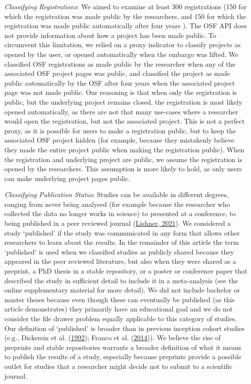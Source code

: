 \documentclass[
  ,jou, a4paper,floatsintext]{apa6}
\begin{document}
\emph{Classifying Registrations}: We aimed to examine at least 300 registrations (150 for which the registration was made public by the researchers, and 150 for which the registration was made public automatically after four years ). The OSF API does not provide information about how a project has been made public. To circumvent this limitation, we relied on a proxy indicator to classify projects as opened by the user, or opened automatically when the embargo was lifted. We classified OSF registrations as made public by the researcher when any of the associated OSF project pages was public, and classified the project as made public automatically by the OSF after four years when the associated project page was not made public. Our reasoning is that when only the registration is public, but the underlying project remains closed, the registration is most likely opened automatically, as there are not that many use-cases where a researcher would open the registration, but not the associated project. This is not a perfect proxy, as it is possible for users to make a registration public, but to keep the associated OSF project hidden (for example, because they mistakenly believe they made the entire project public when making the registration public). When the registration and underlying project are public, we assume the registration is opened by the researchers. This assumption is more likely to hold, as only users can make underlying project pages public.

\emph{Classifying Publication Status}: Studies can be available in different degrees, ranging from never being analysed (for example because the researcher who collected the data no longer works in science) to presented at a conference, to being published in a peer reviewed journal (\protect\hyperlink{ref-lishner_sorting_2021}{Lishner, 2021}). We considered a study `published' if the study was communicated in any form that allows other researchers to learn about the results. In the remainder of this article the term `published' is used when we classified studies as publicly shared because they appeared in the peer reviewed literature, but also when they were shared as a preprint, a PhD thesis in a stable repository, or a poster or conference paper that described the study in sufficient detail to include it in a meta-analysis (see the online supplementary material for more detail). We did not include bachelor or master theses because even though these can eventually be published (as this article demonstrates) they primarily have an educational goal and we do not consider the file drawer problem equally applicable to this category of studies. Our definition of `published' is broader than in previous inception cohort studies (e.g., Dickersin et al. (\protect\hyperlink{ref-dickersin_factors_1992}{1992}); Franco et al. (\protect\hyperlink{ref-franco_publication_2014}{2014})). We believe the rise of preprints and stable repositories warrants a broader definition of what it means to publish the results of a study, especially because preprints provide a possible outlet for studies that a researcher might decide not to submit to a scientific journal.
\end{document}

